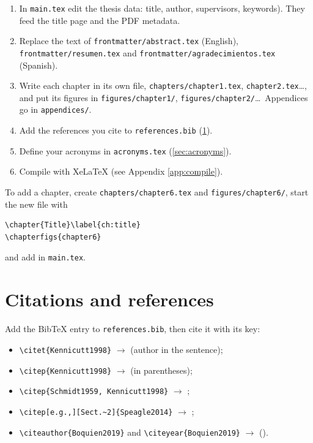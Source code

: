 \begin{enumerate}
  \item In \texttt{main.tex} edit the thesis data: title, author, supervisors, keywords). They feed the title page and the PDF metadata.
  \item Replace the text of \texttt{frontmatter/\allowbreak abstract.tex} (English), \texttt{frontmatter/\allowbreak resumen.tex} and \texttt{frontmatter/\allowbreak agradecimientos.tex} (Spanish).
  \item Write each chapter in its own file, \texttt{chapters/\allowbreak chapter1.tex}, \texttt{chapter2.tex}\ldots, and put its figures in \texttt{figures/\allowbreak chapter1/\allowbreak }, \texttt{figures/\allowbreak chapter2/\allowbreak }\ldots\ Appendices go in \texttt{appendices/\allowbreak }.
  \item Add the references you cite to \texttt{references.bib} (\cref{sec:cites}).
  \item Define your acronyms in \texttt{acronyms.tex} (\cref{sec:acronyms}).
  \item Compile with XeLaTeX (see Appendix \ref{app:compile}).
\end{enumerate}

\vspace{1cm}
To add a chapter, create \texttt{chapters/\allowbreak chapter6.tex} and \texttt{figures/\allowbreak chapter6/}, start the new file with
\begin{verbatim}
\chapter{Title}\label{ch:title}
\chapterfigs{chapter6}
\end{verbatim}
and add \verb|| in \texttt{main.tex}.

\section{Citations and references}\label{sec:cites}

Add the BibTeX entry to \texttt{references.bib}, then cite it with its key:

\begin{itemize}
  \item \verb|\citet{Kennicutt1998}| $\to$ \citet{Kennicutt1998} (author in the sentence);
  \item \verb|\citep{Kennicutt1998}| $\to$ \citep{Kennicutt1998} (in parentheses);
  \item \verb|\citep{Schmidt1959, Kennicutt1998}| $\to$ \citep{Schmidt1959, Kennicutt1998};
  \item \verb|\citep[e.g.,][Sect.~2]{Speagle2014}| $\to$ \citep[e.g.,][Sect.~2]{Speagle2014};
  \item \verb|\citeauthor{Boquien2019}| and \verb|\citeyear{Boquien2019}| $\to$ \citeauthor{Boquien2019} (\citeyear{Boquien2019}).
\end{itemize}

